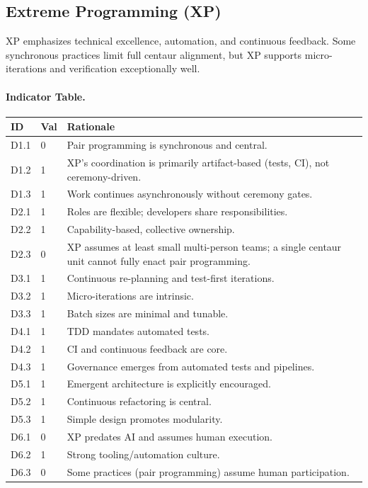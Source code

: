 \documentclass[11pt, a4paper, twocolumn]{article} %
\begin{document}
\newpage
\subsection*{Extreme Programming (XP)}

XP \citep{beck1999xp} emphasizes technical excellence, automation, and continuous
feedback. Some synchronous practices limit full centaur alignment, but XP
supports micro-iterations and verification exceptionally well.

\paragraph{Indicator Table.}

\begin{table}[h]
\centering
\begin{tabular}{llp{10.5cm}}
\toprule
\textbf{ID} & \textbf{Val} & \textbf{Rationale} \\
\midrule
D1.1 & 0 & Pair programming is synchronous and central. \\
D1.2 & 1 & XP's coordination is primarily artifact-based (tests, CI), not ceremony-driven. \\
D1.3 & 1 & Work continues asynchronously without ceremony gates. \\
\midrule
D2.1 & 1 & Roles are flexible; developers share responsibilities. \\
D2.2 & 1 & Capability-based, collective ownership. \\
D2.3 & 0 & XP assumes at least small multi-person teams; a single centaur unit cannot fully enact pair programming. \\
\midrule
D3.1 & 1 & Continuous re-planning and test-first iterations. \\
D3.2 & 1 & Micro-iterations are intrinsic. \\
D3.3 & 1 & Batch sizes are minimal and tunable. \\
\midrule
D4.1 & 1 & TDD mandates automated tests. \\
D4.2 & 1 & CI and continuous feedback are core. \\
D4.3 & 1 & Governance emerges from automated tests and pipelines. \\
\midrule
D5.1 & 1 & Emergent architecture is explicitly encouraged. \\
D5.2 & 1 & Continuous refactoring is central. \\
D5.3 & 1 & Simple design promotes modularity. \\
\midrule
D6.1 & 0 & XP predates AI and assumes human execution. \\
D6.2 & 1 & Strong tooling/automation culture. \\
D6.3 & 0 & Some practices (pair programming) assume human participation. \\
\bottomrule
\end{tabular}
\end{table}
\end{document}

